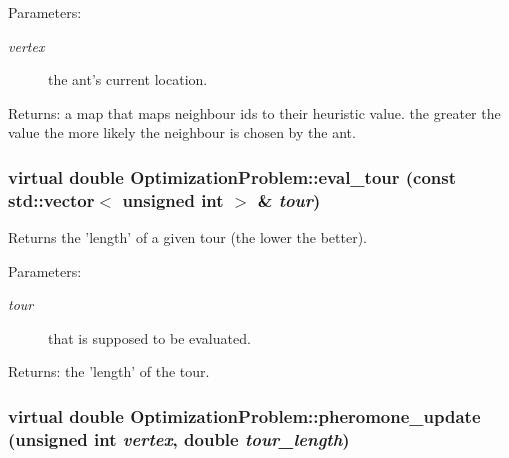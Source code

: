\begin{Desc}
\item[Parameters:]
\begin{description}
\item[{\em vertex}]the ant's current location. \end{description}
\end{Desc}
\begin{Desc}
\item[Returns:]a map that maps neighbour ids to their heuristic value. the greater the value the more likely the neighbour is chosen by the ant. \end{Desc}
\hypertarget{classOptimizationProblem_7e89680c220a5b45c716127145227034}{
\subsubsection[eval\_\-tour]{\setlength{\rightskip}{0pt plus 5cm}virtual double OptimizationProblem::eval\_\-tour (const std::vector$<$ unsigned int $>$ \& {\em tour})}}
\label{classOptimizationProblem_7e89680c220a5b45c716127145227034}


Returns the 'length' of a given tour (the lower the better). 

\begin{Desc}
\item[Parameters:]
\begin{description}
\item[{\em tour}]that is supposed to be evaluated. \end{description}
\end{Desc}
\begin{Desc}
\item[Returns:]the 'length' of the tour. \end{Desc}
\hypertarget{classOptimizationProblem_835a3b10f21b237610a9c2b9999c3589}{
\subsubsection[pheromone\_\-update]{\setlength{\rightskip}{0pt plus 5cm}virtual double OptimizationProblem::pheromone\_\-update (unsigned int {\em vertex}, \/  double {\em tour\_\-length})}}
\label{classOptimizationProblem_835a3b10f21b237610a9c2b9999c3589}


